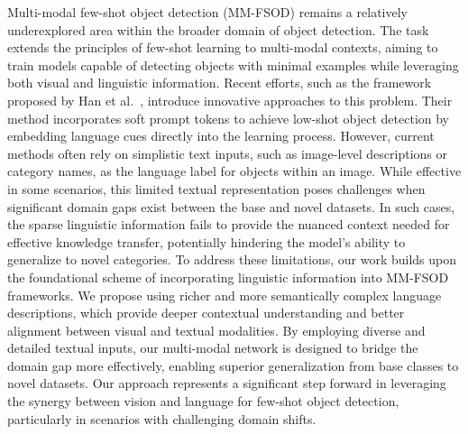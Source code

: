 Multi-modal few-shot object detection (MM-FSOD) remains a relatively underexplored area within the broader domain of object detection. The task extends the principles of few-shot learning to multi-modal contexts, aiming to train models capable of detecting objects with minimal examples while leveraging both visual and linguistic information. Recent efforts, such as the framework proposed by Han et al.~\cite{han2023multimodal}, introduce innovative approaches to this problem. Their method incorporates soft prompt tokens to achieve low-shot object detection by embedding language cues directly into the learning process. 
However, current methods often rely on simplistic text inputs, such as image-level descriptions or category names, as the language label for objects within an image. While effective in some scenarios, this limited textual representation poses challenges when significant domain gaps exist between the base and novel datasets. In such cases, the sparse linguistic information fails to provide the nuanced context needed for effective knowledge transfer, potentially hindering the model’s ability to generalize to novel categories.
To address these limitations, our work builds upon the foundational scheme of incorporating linguistic information into MM-FSOD frameworks. We propose using richer and more semantically complex language descriptions, which provide deeper contextual understanding and better alignment between visual and textual modalities. By employing diverse and detailed textual inputs, our multi-modal network is designed to bridge the domain gap more effectively, enabling superior generalization from base classes to novel datasets. Our approach represents a significant step forward in leveraging the synergy between vision and language for few-shot object detection, particularly in scenarios with challenging domain shifts.

